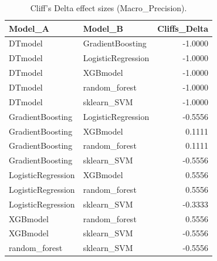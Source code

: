 \begin{table}[t]
\centering
\begin{tabular}{llr}
\toprule
Model_A & Model_B & Cliffs_Delta \\
\midrule
DTmodel & GradientBoosting & -1.0000 \\
DTmodel & LogisticRegression & -1.0000 \\
DTmodel & XGBmodel & -1.0000 \\
DTmodel & random_forest & -1.0000 \\
DTmodel & sklearn_SVM & -1.0000 \\
GradientBoosting & LogisticRegression & -0.5556 \\
GradientBoosting & XGBmodel & 0.1111 \\
GradientBoosting & random_forest & 0.1111 \\
GradientBoosting & sklearn_SVM & -0.5556 \\
LogisticRegression & XGBmodel & 0.5556 \\
LogisticRegression & random_forest & 0.5556 \\
LogisticRegression & sklearn_SVM & -0.3333 \\
XGBmodel & random_forest & 0.5556 \\
XGBmodel & sklearn_SVM & -0.5556 \\
random_forest & sklearn_SVM & -0.5556 \\
\bottomrule
\end{tabular}
\caption{Cliff's Delta effect sizes (Macro_Precision).}
\label{tab:cliffs_Macro_Precision}
\end{table}